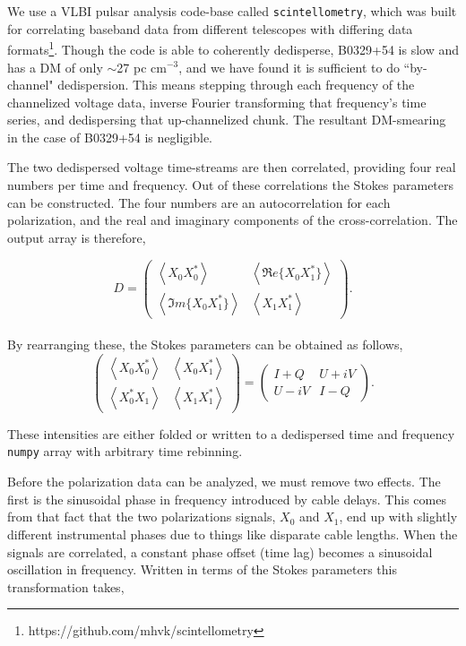 We use a VLBI pulsar analysis code-base called 
{\tt scintellometry}, which was built for 
correlating baseband data from different telescopes 
with differing data formats\footnote{https://github.com/mhvk/scintellometry}. 
Though the code is able to coherently dedisperse, 
B0329+54 is slow and has a DM of only 
$\sim$27 pc cm$^{-3}$, and we have found it is sufficient to do ``by-channel" 
dedispersion. This means stepping through each frequency 
of the channelized voltage data, inverse Fourier transforming 
that frequency's time series, and dedispersing that up-channelized 
chunk. The resultant DM-smearing in the case of 
B0329+54 is negligible. 

The two dedispersed voltage time-streams are then correlated, 
providing four real numbers per time and frequency. 
Out of these correlations the Stokes parameters 
can be constructed. The four numbers are an autocorrelation for each 
polarization, and the real and imaginary components of the
cross-correlation. The output array is therefore,

\begin{equation}
D = \begin{pmatrix}
\left< X_0X_0^*\right> & \left< \Re e\{X_0X_1^*\}\right >\\ 
 \left< \Im m\{X_0X_1^*\}\right > & \left< X_1X_1^*\right>
\end{pmatrix}.
\end{equation}
\\
\noindent By rearranging these, the Stokes parameters can 
be obtained as follows,
\\
\begin{equation}
\begin{pmatrix}
\left< X_0X_0^*\right> & \left< X_0X_1^*\right >\\ 
 \left< X_0^*X_1 \right > & \left< X_1X_1^*\right>
\end{pmatrix} = 
\begin{pmatrix}
I + Q & U + iV\\ 
U -iV & I - Q
\end{pmatrix}.
\end{equation}


\noindent These intensities are either folded 
or written to a dedispersed time and frequency {\tt numpy} 
array with arbitrary time rebinning. 

Before the polarization data can be analyzed, 
we must remove two effects. The first is the 
sinusoidal phase in frequency introduced by cable delays. 
This comes from that fact that the two polarizations signals, 
$X_0$ and $X_1$, end up with slightly different instrumental 
phases due to things like disparate cable lengths. When 
the signals are correlated, a constant phase offset (time lag) 
becomes a sinusoidal oscillation in frequency. 
Written in terms of the Stokes parameters
this transformation takes,

